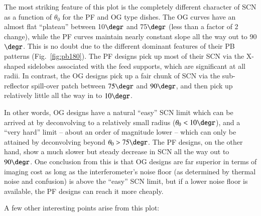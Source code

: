 \documentclass{aa}
\begin{document}
The most striking feature of this plot is the completely different character of SCN as a function of $\theta_0$ for the PF and OG type dishes. The OG curves have an almost flat ``plateau'' between 10$\degr$ and 75$\degr$ (less than a factor of 2 change), while the PF curves maintain nearly constant slope all the way out to 90$\degr$. This is no doubt due to the different dominant features of their PB patterns (Fig.~\ref{fig:pb180}). The PF designs pick up most of their SCN via the X-shaped sidelobes associated with the feed supports, which are significant at all radii. In contrast, the OG designs pick up a fair chunk of SCN via the sub-reflector spill-over patch between $75\degr$ and $90\degr$, and then pick up relatively little all the way in to $10\degr$. 

In other words, OG designs have a natural ``easy'' SCN limit which can be arrived at by deconvolving to a relatively small radius ($\theta_0<10\degr$), and a ``very hard'' limit -- about an order of magnitude lower -- which can only be attained by deconvolving beyond $\theta_0>75\degr$. The PF designs, on the other hand, show a much slower but steady decrease in SCN all the way out to $90\degr$. One conclusion from this is that OG designs are far superior in terms of imaging cost as long as the  interferometer's noise floor (as determined by thermal noise and confusion) is above the ``easy'' SCN limit, but if a lower noise floor is available, the PF designs can reach it more cheaply.

A few other interesting points arise from this plot:
\end{document}
